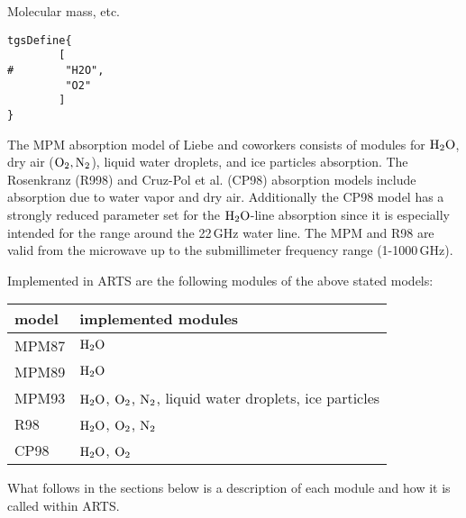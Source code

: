 {Molecular mass, etc. 


\begin{verbatim}
tgsDefine{       
        [ 
#        "H2O",
         "O2"
        ]
}
\end{verbatim}
%
%
%
%
\label{levelb:CompAbsMod}
%
The MPM absorption model of Liebe and coworkers consists of modules for 
$\mbox{H}_2\mbox{O}$, dry air ($\mbox{O}_2, \mbox{N}_2$), liquid water droplets, and ice particles 
absorption. The Rosenkranz (R998) and Cruz-Pol et al. (CP98) absorption 
models include absorption due to water vapor and dry air. Additionally 
the CP98 model has a strongly reduced parameter set for the $\mbox{H}_2\mbox{O}$-line 
absorption since it is especially intended for the range around the 
22\,GHz water line. The MPM and R98 are valid from the microwave 
up to the submillimeter frequency range (1-1000\,GHz).

Implemented in ARTS are the following modules of the above stated models:
%
\begin{center}
\begin{tabular}{ll}
\hline
model & implemented modules \\
\hline
MPM87 & $\mbox{H}_2\mbox{O}$ \\
MPM89 & $\mbox{H}_2\mbox{O}$ \\
MPM93 & $\mbox{H}_2\mbox{O}$, $\mbox{O}_2$, $\mbox{N}_2$, liquid water droplets, ice particles \\
R98   & $\mbox{H}_2\mbox{O}$, $\mbox{O}_2$, $\mbox{N}_2$ \\
CP98  & $\mbox{H}_2\mbox{O}$, $\mbox{O}_2$ \\
\hline
\end{tabular}
\end{center}
%
What follows in the sections below is a description of each module and how it is 
called within ARTS.

}
